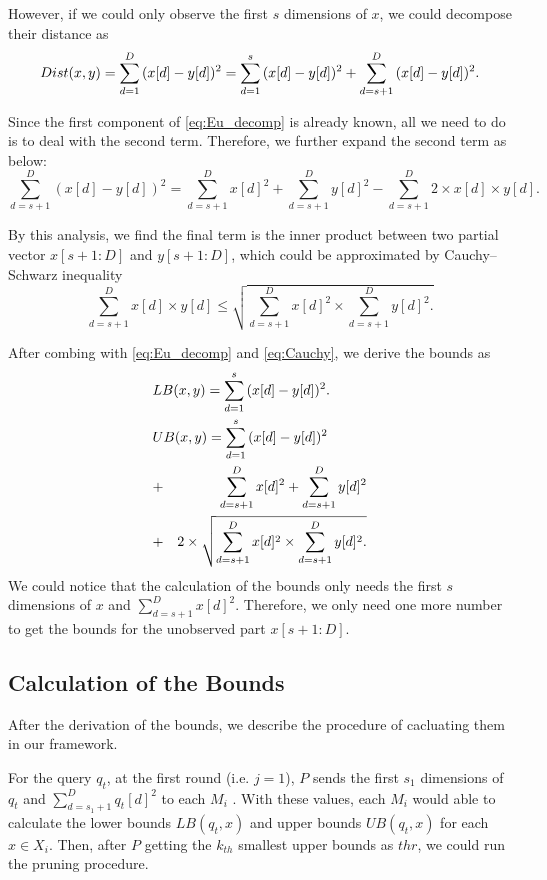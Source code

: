However, if we could only observe the first $s$ dimensions of $x$, we could decompose their distance as 
\begin{equation}\label{eq:Eu_decomp}
	Dist(x,y)=\sum^D_{d=1}{(x[d]-y[d])^2}\\
				=\sum^s_{d=1}{(x[d]-y[d])^2} + \sum^D_{d=s+1}{(x[d]-y[d])^2.}	
\end{equation}

Since the first component of \eqref{eq:Eu_decomp} is already known, all we need to do is to deal with the second term. Therefore, we further expand the second term as below:
\[
\sum^D_{d=s+1}{(x[d]-y[d])^2}=\sum^D_{d=s+1}{x[d]^2}+\sum^D_{d=s+1}{y[d]^2}-\sum^D_{d=s+1}{2\times x[d]\times y[d].}
\]

By this analysis, we find the final term is the inner product between two partial vector $x[s+1:D]$ and $y[s+1:D]$, which could be approximated by Cauchy–Schwarz inequality
\begin{equation}\label{eq:Cauchy}
	\sum^D_{d=s+1}{x[d]\times y[d]} \leq \sqrt{\sum^D_{d=s+1}{x[d]^2}\times \sum^D_{d=s+1}{y[d]^2}.}
\end{equation}

After combing with \eqref{eq:Eu_decomp} and \eqref{eq:Cauchy}, we derive the bounds as 
{
\begin{eqnarray}
\lefteqn{LB(x,y) = \sum^s_{d=1}{(x[d]-y[d])^2}.} \label{eq:single-LB} \\
\lefteqn{UB(x,y) = \sum^s_{d=1}{(x[d]-y[d])^2}} \notag \\
& + & \sum^D_{d=s+1}{x[d]^2}+\sum^D_{d=s+1}{y[d]^2} \notag \\
& + & 2 \times \sqrt{\sum^D_{d=s+1}{x[d]^2}\times \sum^D_{d=s+1}{y[d]^2}.}\label{eq:single-UB}
\end{eqnarray}
}
We could notice that the calculation of the bounds only needs the first $s$ dimensions of $x$ and $\sum^D_{d=s+1}{x[d]^2}$.  Therefore, we only need one more number to get the bounds for the unobserved part $x[s+1:D]$.


\subsection{Calculation of the Bounds} %
\label{sub:calculation_the_bounds}
After the derivation of the bounds, we describe the procedure of cacluating them in our framework.  

For the query $q_t$, at the first round (i.e. $j=1$), $P$ sends the first $s_1$ dimensions of $q_t$ and $\sum^D_{d=s_1+1}{q_t[d]}^2$ to each $M_i$ .  With these values, each $M_i$ would able to calculate the lower bounds $LB(q_t,x)$ and upper bounds $UB(q_t,x)$ for each $x\in X_i$.  Then, after $P$ getting the $k_{th}$ smallest upper bounds as $thr$, we could run the pruning procedure.

